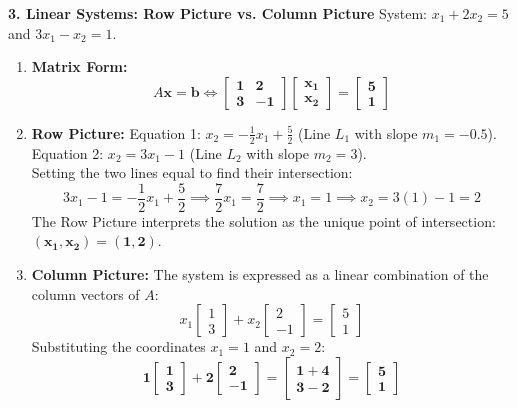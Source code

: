 \textbf{3. Linear Systems: Row Picture vs. Column Picture}
System: $x_1 + 2x_2 = 5$ and $3x_1 - x_2 = 1$.
\begin{enumerate}
    \item \textbf{Matrix Form:}
    \begin{equation*}
    A\mathbf{x} = \mathbf{b} \iff \mathbf{\begin{bmatrix} 1 & 2 \\ 3 & -1 \end{bmatrix} \begin{bmatrix} x_1 \\ x_2 \end{bmatrix} = \begin{bmatrix} 5 \\ 1 \end{bmatrix}}
    \end{equation*}
    \item \textbf{Row Picture:}
    Equation 1: $x_2 = -\frac{1}{2}x_1 + \frac{5}{2}$ (Line $L_1$ with slope $m_1 = -0.5$). \\
    Equation 2: $x_2 = 3x_1 - 1$ (Line $L_2$ with slope $m_2 = 3$). \\
    Setting the two lines equal to find their intersection:
    \begin{equation*}
    3x_1 - 1 = -\frac{1}{2}x_1 + \frac{5}{2} \implies \frac{7}{2}x_1 = \frac{7}{2} \implies x_1 = 1 \implies x_2 = 3(1) - 1 = 2
    \end{equation*}
    The Row Picture interprets the solution as the unique point of intersection: $\mathbf{(x_1, x_2) = (1, 2)}$.
    \item \textbf{Column Picture:}
    The system is expressed as a linear combination of the column vectors of $A$:
    \begin{equation*}
    x_1 \begin{bmatrix} 1 \\ 3 \end{bmatrix} + x_2 \begin{bmatrix} 2 \\ -1 \end{bmatrix} = \begin{bmatrix} 5 \\ 1 \end{bmatrix}
    \end{equation*}
    Substituting the coordinates $x_1 = 1$ and $x_2 = 2$:
    \begin{equation*}
    \mathbf{1 \begin{bmatrix} 1 \\ 3 \end{bmatrix} + 2 \begin{bmatrix} 2 \\ -1 \end{bmatrix} = \begin{bmatrix} 1 + 4 \\ 3 - 2 \end{bmatrix} = \begin{bmatrix} 5 \\ 1 \end{bmatrix}}

\end{equation*}
\end{enumerate}
